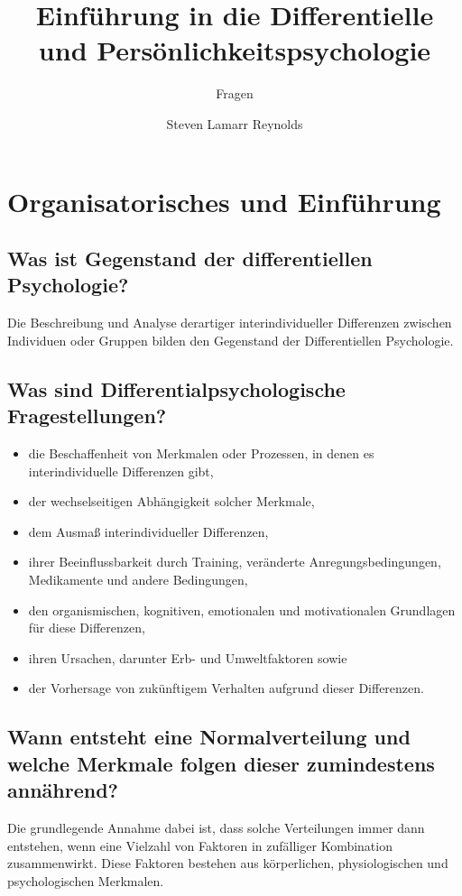\documentclass[a6paper,10pt,DIV=40]{scrartcl}
\begin{document}
\title{Einführung in die Differentielle und Persönlichkeitspsychologie}
\subtitle{Fragen}
\author{Steven Lamarr Reynolds}
\maketitle

\clearpage
\tableofcontents
\clearpage

\section{Organisatorisches und Einführung}

\subsection{Was ist Gegenstand der differentiellen Psychologie?}
    Die Beschreibung und Analyse derartiger interindividueller Differenzen zwischen Individuen oder Gruppen bilden den Gegenstand der Differentiellen Psychologie.
\subsection{Was sind Differentialpsychologische Fragestellungen?}
    \begin{itemize}\itemsep-0.5ex
        \item die Beschaffenheit von Merkmalen oder Prozessen, in denen es interindividuelle Differenzen gibt,
        \item der wechselseitigen Abhängigkeit solcher Merkmale,
        \item dem Ausmaß interindividueller Differenzen,
        \item ihrer Beeinflussbarkeit durch Training, veränderte Anregungsbedingungen, Medikamente und andere Bedingungen,
        \item den organismischen, kognitiven, emotionalen und motivationalen Grundlagen für diese Differenzen,
        \item ihren Ursachen, darunter Erb- und Umweltfaktoren sowie
        \item der Vorhersage von zukünftigem Verhalten aufgrund dieser Differenzen.
    \end{itemize}
\subsection{Wann entsteht eine Normalverteilung und welche Merkmale folgen dieser zumindestens annährend?}
    Die grundlegende Annahme dabei ist, dass solche Verteilungen immer dann entstehen, wenn eine Vielzahl von Faktoren in zufälliger Kombination zusammenwirkt. Diese Faktoren bestehen aus körperlichen, physiologischen und psychologischen Merkmalen.
\end{document}
